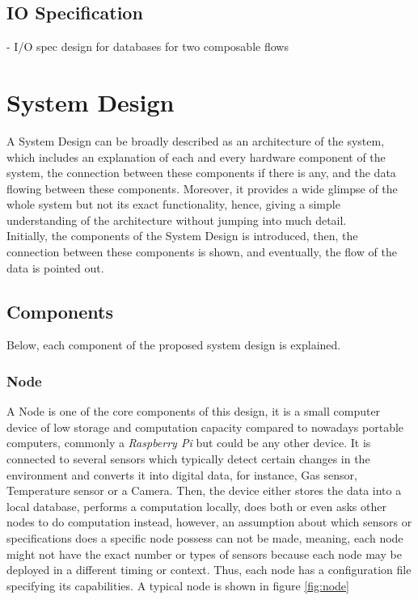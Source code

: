 \subsection{IO Specification}
- I/O spec design for databases for two composable flows


\section{System Design }
A System Design can be broadly described as an architecture of the system, which includes an explanation of each and every hardware component of the system, the connection between these components if there is any, and the data flowing between these components. Moreover, it provides a wide glimpse of the whole system but not its exact functionality, hence, giving a simple understanding of the architecture without jumping into much detail.\\
Initially, the components of the System Design is introduced, then, the connection between these components is shown, and eventually, the flow of the data is pointed out.

\subsection{Components}
\label{sub:components}
Below, each component of the proposed system design is explained.

\subsubsection{Node}
\label{subsub:node}
A Node is one of the core components of this design, it is a small computer device of low storage and computation capacity compared to nowadays portable computers, commonly a \textit{Raspberry Pi} but could be any other device. It is connected to several sensors which typically detect certain changes in the environment and converts it into digital data, for instance, Gas sensor, Temperature sensor or a Camera. Then, the device either stores the data into a local database, performs a computation locally, does both or even asks other nodes to do computation instead, however, an assumption about which sensors or specifications does a specific node  possess can not be made, meaning, each node might not have the exact number or types of sensors because each node may be deployed in a different timing or context. Thus, each node has a configuration file specifying its capabilities. A typical node is shown in figure \ref{fig:node}

